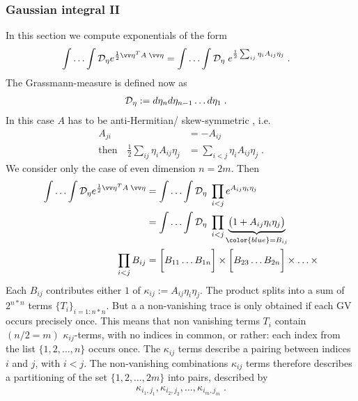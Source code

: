 \subsubsection{Gaussian integral II}




In this section we compute exponentials of the form
%
\begin{align}\label{eq:gaussian:II:A}
\int\ldots\int \Deta  e^{\frac{1}{2}\vv\eta^{T} A \;\vv \eta} &=
\int\ldots\int \Deta\; e^{\frac{1}{2}\sum_{ij} \eta_{i} A_{ij} \eta_{j}}\;.
\end{align}
%
The Grassmann-measure is defined now as
%
\begin{align*}
{\cal D}_{\eta}  &:= d \eta_{n} d \eta_{n-1} \ldots d \eta_{1}\;.
\end{align*}
%
In this case $A$ has to be anti-Hermitian/ skew-symmetric , i.e. 
%
\begin{align*}
A_{ji} &= - A_{ij}\\
\text{then}\quad \frac{1}{2}\sum_{ij} \eta_{i} A_{ij} \eta_{j} &=
\sum_{i<j} \eta_{i} A_{ij} \eta_{j}\;.
\end{align*}
%
We consider only the case of even dimension $n=2 m$.
Then
%
\begin{align}\label{eq:gaussian:II:B}
\int\ldots\int \Deta  e^{\frac{1}{2}\vv\eta^{T} A \;\vv \eta}
&=\int\ldots\int \Deta  \;\prod_{i<j} e^{A_{ij} \eta_{i}\eta_{j} }\\
&=\int\ldots\int \Deta \;\prod_{i<j} \underbrace{
\big(1 + A_{ij} \eta_{i}\eta_{j}\big)
}_{\color{blue} = B_{ij}}\\
\prod_{i<j} B_{ij} &= \bigg[B_{11}\ldots B_{1n}\bigg]\times  \bigg[B_{23}\ldots B_{2n} \bigg]\times \ldots \times \label{eq:Bs}
\end{align}
%
Each $B_{ij}$ contributes either $1$ of $\kappa_{ij}:=A_{ij}\eta_{i}\eta_{j}$. The product 
splits into a sum of $2^{n*n}$ terms $\{T_{i}\}_{i=1:n*n}$.
But a   a non-vanishing  trace is only obtained if each GV occurs precisely once.
This means that non vanishing terms $T_{i}$ contain  $(n/2=m)$ $\kappa_{ij}$-terms, with
no indices in common, or rather: each index from the list $\{1,2,\ldots,n\}$ occurs once.
The $\kappa_{ij}$ terms describe a pairing between indices $i$ and $j$, with $i<j$.
The non-vanishing combinations $\kappa_{ij}$ terms therefore describes a
partitioning of the set $\{1,2,\ldots,2m\}$ into pairs,
described by 
%
\begin{align*}
\kappa_{i_{1},j_{1}},\kappa_{i_{2},j_{2}},\ldots,\kappa_{i_{m},j_{m}}\;.
\end{align*}
